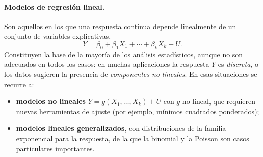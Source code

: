 \paragraph{Modelos de regresión lineal.} Son aquellos en los que una respuesta continua depende
linealmente de un conjunto de variables explicativas,
\[
  Y = \beta_0 + \beta_1X_1 + \cdots + \beta_kX_k + U .
\]
Constituyen la base de la mayoría de los análisis estadísticos, aunque no son adecuados en
todos los casos: en muchas aplicaciones la respuesta $Y$ es \emph{discreta}, o los datos
sugieren la presencia de \emph{componentes no lineales}. En esas situaciones se recurre a:
\begin{itemize}
  \item \textbf{modelos no lineales} $Y=g(X_1,\ldots,X_k)+U$ con $g$ no lineal, que requieren
    nuevas herramientas de ajuste (por ejemplo, mínimos cuadrados ponderados);
  \item \textbf{modelos lineales generalizados}, con distribuciones de la familia
    exponencial para la respuesta, de la que la binomial y la Poisson son casos particulares
    importantes.
\end{itemize}
